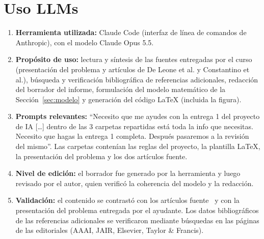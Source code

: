 \documentclass[letter, 10pt]{article}
\begin{document}
\section{Uso LLMs}
\begin{enumerate}
\item \textbf{Herramienta utilizada:} Claude Code (interfaz de línea de comandos de Anthropic), con el modelo Claude Opus 5.5.
\item \textbf{Propósito de uso:} lectura y síntesis de las fuentes entregadas por el curso (presentación del problema y artículos de De Leone et al. y Constantino et al.), búsqueda y verificación bibliográfica de referencias adicionales, redacción del borrador del informe, formulación del modelo matemático de la Sección~\ref{sec:modelo} y generación del código \LaTeX{} (incluida la figura).
\item \textbf{Prompts relevantes:} ``Necesito que me ayudes con la entrega 1 del proyecto de IA [\dots] dentro de las 3 carpetas repartidas está toda la info que necesitas. Necesito que hagas la entrega 1 completa. Después pasaremos a la revisión del mismo''. Las carpetas contenían las reglas del proyecto, la plantilla \LaTeX{}, la presentación del problema y los dos artículos fuente.
\item \textbf{Nivel de edición:} el borrador fue generado por la herramienta y luego revisado por el autor, quien verificó la coherencia del modelo y la redacción.
\item \textbf{Validación:} el contenido se contrastó con los artículos fuente~\cite{DeLeone2011a,Constantino2017} y con la presentación del problema entregada por el ayudante. Los datos bibliográficos de las referencias adicionales se verificaron mediante búsquedas en las páginas de las editoriales (AAAI, JAIR, Elsevier, Taylor \& Francis).
\end{enumerate}



\end{document}
